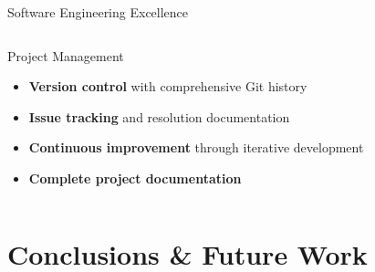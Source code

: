\documentclass[aspectratio=169]{beamer}
\newcommand{\highlight}[1]{\textcolor{kentech_orange}{\textbf{#1}}}
\begin{document}
\begin{frame}{Software Engineering Excellence}
\begin{columns}
\begin{column}{0.5\textwidth}
            \begin{block}{Project Management}
                \begin{itemize}
                    \item \highlight{Version control} with comprehensive Git history
                    \item \highlight{Issue tracking} and resolution documentation
                    \item \highlight{Continuous improvement} through iterative development
                    \item \highlight{Complete project documentation}
                \end{itemize}
            \end{block}
        \end{column}
    \end{columns}
\end{frame}

\section{Conclusions \& Future Work}
\end{document}
